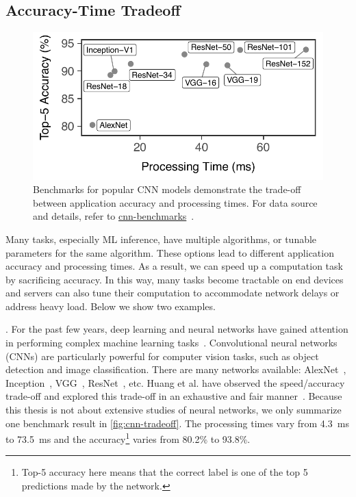 \subsection{Accuracy-Time Tradeoff}
\label{sec:comp-perf-model}

\begin{figure}[t]
  \centering
  \includegraphics[width=.7\columnwidth]{figures/tradeoff-cnn.pdf}
  \caption{Benchmarks for popular CNN models demonstrate the trade-off between
    application accuracy and processing times. For data source and details,
    refer to
    \href{https://github.com/jcjohnson/cnn-benchmarks}{cnn-benchmarks}~\cite{cnn.benchmarks}.
  }
  \label{fig:cnn-tradeoff}
\end{figure}

Many tasks, especially ML inference, have multiple algorithms, or tunable
parameters for the same algorithm. These options lead to different application
accuracy and processing times. As a result, we can speed up a computation task
by sacrificing accuracy. In this way, many tasks become tractable on end devices
and servers can also tune their computation to accommodate network delays or
address heavy load. Below we show two examples.

. For the past few years, deep
learning and neural networks have gained attention in performing complex machine
learning tasks~\cite{goodfellow2016deep}. Convolutional neural networks (CNNs)
are particularly powerful for computer vision tasks, such as object detection
and image classification. There are many networks available:
AlexNet~\cite{krizhevsky2012imagenet}, Inception~\cite{szegedy2015going},
VGG~\cite{simonyan2014very}, ResNet~\cite{he2016deep}, etc. Huang et al. have
observed the speed/accuracy trade-off and explored this trade-off in an
exhaustive and fair manner~\cite{huang2016speed}. Because this thesis is not
about extensive studies of neural networks, we only summarize one benchmark
result in \autoref{fig:cnn-tradeoff}. The processing times vary from
\SI{4.3}{\ms} to \SI{73.5}{\ms} and the accuracy\footnote{Top-5 accuracy here
  means that the correct label is one of the top 5 predictions made by the
  network.} varies from 80.2\% to 93.8\%.

